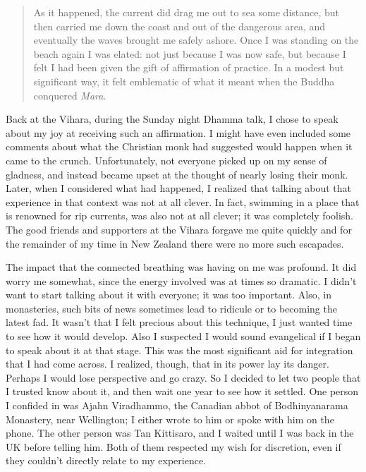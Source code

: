 \begin{quotation}
As it happened, the current did drag me out to sea some distance, but
then carried me down the coast and out of the dangerous area, and
eventually the waves brought me safely ashore. Once I was standing on
the beach again I was elated: not just because I was now safe, but
because I felt I had been given the gift of affirmation of practice. In
a modest but significant way, it felt emblematic of what it meant when
the Buddha conquered \emph{Mara}.
\end{quotation}

Back at the Vihara, during the Sunday night Dhamma talk, I chose to
speak about my joy at receiving such an affirmation. I might have even
included some comments about what the Christian monk had suggested would
happen when it came to the crunch. Unfortunately, not everyone picked up
on my sense of gladness, and instead became upset at the thought of
nearly losing their monk. Later, when I considered what had happened, I
realized that talking about that experience in that context was not at
all clever. In fact, swimming in a place that is renowned for rip
currents, was also not at all clever; it was completely foolish. The
good friends and supporters at the Vihara forgave me quite quickly and
for the remainder of my time in New Zealand there were no more such
escapades.

The impact that the connected breathing was having on me was profound.
It did worry me somewhat, since the energy involved was at times so
dramatic. I didn't want to start talking about it with everyone; it was
too important. Also, in monasteries, such bits of news sometimes lead to
ridicule or to becoming the latest fad. It wasn't that I felt precious
about this technique, I just wanted time to see how it would develop.
Also I suspected I would sound evangelical if I began to speak about it
at that stage. This was the most significant aid for integration that I
had come across. I realized, though, that in its power lay its danger.
Perhaps I would lose perspective and go crazy. So I decided to let two
people that I trusted know about it, and then wait one year to see how
it settled. One person I confided in was Ajahn Viradhammo, the Canadian
abbot of Bodhinyanarama Monastery, near Wellington; I either wrote to
him or spoke with him on the phone. The other person was Tan Kittisaro,
and I waited until I was back in the UK before telling him. Both of them
respected my wish for discretion, even if they couldn't directly relate
to my experience.

